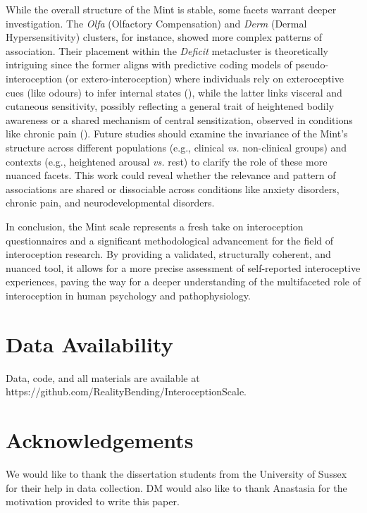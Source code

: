 \documentclass[
  jou,
  floatsintext,
  longtable,
  nolmodern,
  notxfonts,
  notimes,
  colorlinks=true,linkcolor=blue,citecolor=blue,urlcolor=blue]{apa7}
\begin{document}
While the overall structure of the Mint is stable, some facets warrant
deeper investigation. The \emph{Olfa} (Olfactory Compensation) and
\emph{Derm} (Dermal Hypersensitivity) clusters, for instance, showed
more complex patterns of association. Their placement within the
\emph{Deficit} metacluster is theoretically intriguing since the former
aligns with predictive coding models of pseudo-interoception (or
extero-interoception) where individuals rely on exteroceptive cues (like
odours) to infer internal states
(), while
the latter links visceral and cutaneous sensitivity, possibly reflecting
a general trait of heightened bodily awareness or a shared mechanism of
central sensitization, observed in conditions like chronic pain
(). Future
studies should examine the invariance of the Mint's structure across
different populations (e.g., clinical \emph{vs.} non-clinical groups)
and contexts (e.g., heightened arousal \emph{vs.} rest) to clarify the
role of these more nuanced facets. This work could reveal whether the
relevance and pattern of associations are shared or dissociable across
conditions like anxiety disorders, chronic pain, and neurodevelopmental
disorders.

In conclusion, the Mint scale represents a fresh take on interoception
questionnaires and a significant methodological advancement for the
field of interoception research. By providing a validated, structurally
coherent, and nuanced tool, it allows for a more precise assessment of
self-reported interoceptive experiences, paving the way for a deeper
understanding of the multifaceted role of interoception in human
psychology and pathophysiology.

\section{Data Availability}\label{data-availability}

Data, code, and all materials are available at
https://github.com/RealityBending/InteroceptionScale.

\section{Acknowledgements}\label{acknowledgements}

We would like to thank the dissertation students from the University of
Sussex for their help in data collection. DM would also like to thank
Anastasia for the motivation provided to write this paper.
\end{document}
